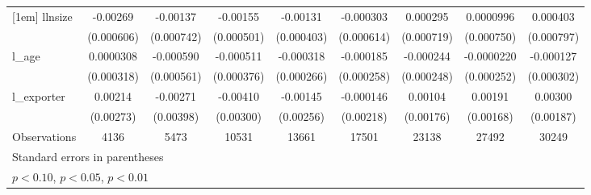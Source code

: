 \begin{table}[htbp]
\begin{tabular}{l*{8}{c}}
[1em]
llnsize     &    -0.00269\sym{***}&    -0.00137\sym{*}  &    -0.00155\sym{***}&    -0.00131\sym{***}&   -0.000303         &    0.000295         &   0.0000996         &    0.000403         \\
            &  (0.000606)         &  (0.000742)         &  (0.000501)         &  (0.000403)         &  (0.000614)         &  (0.000719)         &  (0.000750)         &  (0.000797)         \\
[1em]
l\_age       &   0.0000308         &   -0.000590         &   -0.000511         &   -0.000318         &   -0.000185         &   -0.000244         &  -0.0000220         &   -0.000127         \\
            &  (0.000318)         &  (0.000561)         &  (0.000376)         &  (0.000266)         &  (0.000258)         &  (0.000248)         &  (0.000252)         &  (0.000302)         \\
[1em]
l\_exporter  &     0.00214         &    -0.00271         &    -0.00410         &    -0.00145         &   -0.000146         &     0.00104         &     0.00191         &     0.00300         \\
            &   (0.00273)         &   (0.00398)         &   (0.00300)         &   (0.00256)         &   (0.00218)         &   (0.00176)         &   (0.00168)         &   (0.00187)         \\
\hline
Observations&        4136         &        5473         &       10531         &       13661         &       17501         &       23138         &       27492         &       30249         \\
\hline\hline
\multicolumn{9}{l}{\footnotesize Standard errors in parentheses}\\
\multicolumn{9}{l}{\footnotesize \sym{*} \(p<0.10\), \sym{**} \(p<0.05\), \sym{***} \(p<0.01\)}\\
\end{tabular}
\end{table}
